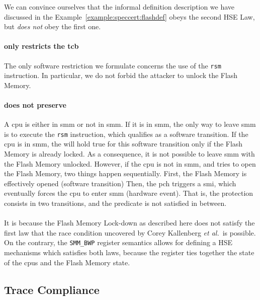 \begin{example}
  We can convince ourselves that the informal definition description we have
  discussed in the Example~\ref{example:speccert:flashdef} obeys the second HSE
  Law, but \emph{does not} obey the first one.
  \paragraph{ only restricts the \ac{tcb}}
  The only software restriction we formulate concerns the use of the
  \texttt{rsm} instruction.
  In particular, we do not forbid the attacker to unlock the Flash Memory.

  \paragraph{ does not preserve }
  A \ac{cpu} is either in \ac{smm} or not in \ac{smm}.
  If it is in \ac{smm}, the only way to leave \ac{smm} is to execute the
  \texttt{rsm} instruction, which qualifies as a software transition.
  If the \ac{cpu} is in \ac{smm}, the  will hold true for this
  software transition only if the Flash Memory is already locked.
  As a consequence, it is not possible to leave \ac{smm} with the Flash Memory
  unlocked.
  However, if the \ac{cpu} is not in \ac{smm}, and tries to open the Flash
  Memory, two things happen sequentially.
  First, the Flash Memory is effectively opened (software transition)
  Then, the \ac{pch} triggers a \ac{smi}, which eventually forces the \ac{cpu}
  to enter \ac{smm} (hardware event).
  That is, the protection consists in two transitions, and the 
  predicate is not satisfied in between.

  \paragraph{}
  It is because the Flash Memory Lock-down as described here does not satisfy
  the first law that the race condition uncovered by Corey Kallenberg \emph{et
    al.}\,\cite{kallenberg2015racecondition} is possible.
  On the contrary, the \texttt{SMM\_BWP} register semantics allows for defining
  a HSE mechanisms which satisfies both laws, because the register ties together
  the state of the \acp{cpu} and the Flash Memory state.
\end{example}

\subsection{Trace Compliance}
\label{subsec:speccert:compliant}

